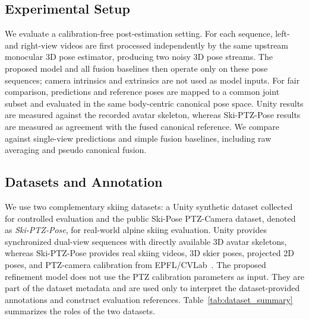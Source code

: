 \documentclass[sigconf,screen]{acmart}
\begin{document}
\subsection{Experimental Setup}

We evaluate a calibration-free post-estimation setting. For each sequence, left- and right-view videos are first processed independently by the same upstream monocular 3D pose estimator, producing two noisy 3D pose streams. The proposed model and all fusion baselines then operate only on these pose sequences; camera intrinsics and extrinsics are not used as model inputs. For fair comparison, predictions and reference poses are mapped to a common joint subset and evaluated in the same body-centric canonical pose space. Unity results are measured against the recorded avatar skeleton, whereas Ski-PTZ-Pose results are measured as agreement with the fused canonical reference. We compare against single-view predictions and simple fusion baselines, including raw averaging and pseudo canonical fusion.

\subsection{Datasets and Annotation}
\label{subsec:dataset_annotation}

We use two complementary skiing datasets: a Unity synthetic dataset collected for controlled evaluation and the public Ski-Pose PTZ-Camera dataset, denoted as \textit{Ski-PTZ-Pose}, for real-world alpine skiing evaluation. Unity provides synchronized dual-view sequences with directly available 3D avatar skeletons, whereas Ski-PTZ-Pose provides real skiing videos, 3D skier poses, projected 2D poses, and PTZ-camera calibration from EPFL/CVLab~\cite{ski_poseptz_dataset}. The proposed refinement model does not use the PTZ calibration parameters as input. They are part of the dataset metadata and are used only to interpret the dataset-provided annotations and construct evaluation references. Table~\ref{tab:dataset_summary} summarizes the roles of the two datasets.
\end{document}
